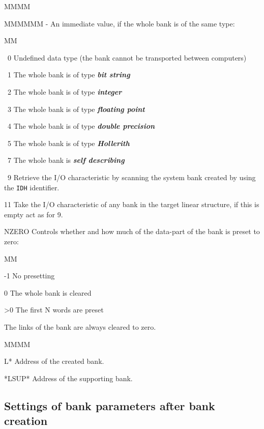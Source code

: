 \begin{DL}{MMMM}
\begin{DL}{MMMMMM}
- An immediate value, if the whole bank is of the same type:
\begin{DL}{MM}
\item[\ 0]Undefined data type (the bank cannot be transported between
computers)
\item[\ 1]The whole bank is of type {\bf\it bit string}
\item[\ 2]The whole bank is of type {\bf\it integer}
\item[\ 3]The whole bank is of type {\bf\it floating point}
\item[\ 4]The whole bank is of type {\bf\it double precision}
\item[\ 5]The whole bank is of type {\bf\it Hollerith}
\item[\ 7]The whole bank is {\bf\it self describing}
\item[\ 9]Retrieve the I/O characteristic by scanning the system
bank created by  using the {\tt IDH} identifier.
\item[11]Take the I/O characteristic of any bank in the
target linear structure, if this is empty act as for 9.
\end{DL}
\end{DL}
\item[NZERO]Controls whether and how much of the data-part
of the bank is preset to zero:
\begin{DL}{MM}
\item[-1]No presetting
\item[ 0]The whole bank is cleared
\item[>0]The first N words are preset
\end{DL}
The links of the bank are always cleared to zero.
\end{DL}
\Odesc
\begin{DL}{MMMM}
\item[L*]Address of the created bank.
\item[*LSUP*]Address of the supporting bank.
\end{DL}
\subsection{Settings of bank parameters after bank creation}
